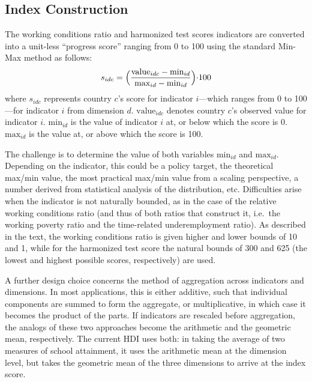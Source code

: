 \documentclass[
  a4paper, twoside, 12pt]{book}
\begin{document}

\setcounter{figure}{0}
\renewcommand{\thefigure}{A2.\arabic{figure}}
\setcounter{table}{0}
\renewcommand{\thetable}{A2.\arabic{table}}

\hypertarget{weights}{%
\subsection*{Index Construction}\label{weights}}


The working conditions ratio and harmonized test scores indicators are converted into a unit-less ``progress score'' ranging from 0 to 100 using the standard Min-Max method as follows:
\[ s_{idc}= \Bigl(\frac{\text{value}_{idc}- \text{min}_{id}}{ \text{max}_{id} - \text{min}_{id}} \Bigl) \cdot 100 \]
\vspace*{5pt}
where \(s_{idc}\) represents country \(c\)'s score for indicator \(i\)---which ranges from 0 to 100---for indicator \(i\) from dimension \(d\). \(\text{value}_{idc}\) denotes country \(c\)'s observed value for indicator \(i\). \(\text{min}_{id}\) is the value of indicator \(i\) at, or below which the score is 0. \(\text{max}_{id}\) is the value at, or above which the score is 100.

The challenge is to determine the value of both variables \(\text{min}_{id}\) and \(\text{max}_{id}\). Depending on the indicator, this could be a policy target, the theoretical max/min value, the most practical max/min value from a scaling perspective, a number derived from statistical analysis of the distribution, etc. Difficulties arise when the indicator is not naturally bounded, as in the case of the relative working conditions ratio (and thus of both ratios that construct it, i.e.~the working poverty ratio and the time-related underemployment ratio). As described in the text, the working conditions ratio is given higher and lower bounds of 10 and 1, while for the harmonized test score the natural bounds of 300 and 625 (the lowest and highest possible scores, respectively) are used.

A further design choice concerns the method of aggregation across indicators and dimensions. In most applications, this is either additive, such that individual components are summed to form the aggregate, or multiplicative, in which case it becomes the product of the parts. If indicators are rescaled before aggregation, the analogs of these two approaches become the arithmetic and the geometric mean, respectively. The current HDI uses both: in taking the average of two measures of school attainment, it uses the arithmetic mean at the dimension level, but takes the geometric mean of the three dimensions to arrive at the index score.
\end{document}
